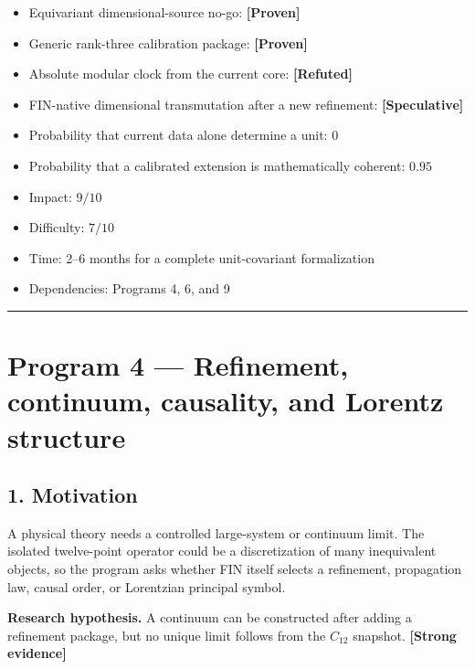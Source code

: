 \documentclass[11pt,a4paper,openany]{report}
\newcommand{\statusProven}{\textcolor{fingreen}{[Proven]}}
\newcommand{\statusStrong}{\textcolor{finblue}{[Strong evidence]}}
\newcommand{\statusSpeculative}{\textcolor{finorange}{[Speculative]}}
\newcommand{\statusRefuted}{\textcolor{finred}{[Refuted]}}
\begin{document}
\begin{itemize}
\item 
Equivariant dimensional-source no-go: \textbf{\statusProven{}}

\item 
Generic rank-three calibration package: \textbf{\statusProven{}}

\item 
Absolute modular clock from the current core: \textbf{\statusRefuted{}}

\item 
FIN-native dimensional transmutation after a new refinement: \textbf{\statusSpeculative{}}

\item 
Probability that current data alone determine a unit: \(0\)

\item 
Probability that a calibrated extension is mathematically coherent: \(0.95\)

\item 
Impact: \(9/10\)

\item 
Difficulty: \(7/10\)

\item 
Time: 2–6 months for a complete unit-covariant formalization

\item 
Dependencies: Programs 4, 6, and 9

\end{itemize}

\par\medskip\hrule\medskip

\chapter{Program 4 — Refinement, continuum, causality, and Lorentz structure}

\section{1. Motivation}

A physical theory needs a controlled large-system or continuum limit. The isolated twelve-point operator could be a discretization of many inequivalent objects, so the program asks whether FIN itself selects a refinement, propagation law, causal order, or Lorentzian principal symbol.

\textbf{Research hypothesis.} A continuum can be constructed after adding a refinement package, but no unique limit follows from the \(C_{12}\) snapshot. \textbf{\statusStrong{}}
\end{document}
